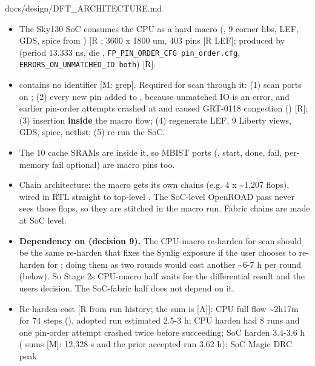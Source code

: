 \begin{relocated}{docs/design/DFT_ARCHITECTURE.md}
\begin{itemize}
\tightlist
\item
  The Sky130 SoC consumes the CPU as a hard macro
  (, 9 corner libs, LEF, GDS, spice from
  ) {[}R \code{soc/config.json}{]}; 3600 x 1800 um,
  403 pins {[}R LEF{]}; produced by 
  (period 13.333 ns, die \code{[0,0,3600,1800]},
  \texttt{FP\_\allowbreak{}PIN\_\allowbreak{}ORDER\_\allowbreak{}CFG\ pin\_\allowbreak{}order.\allowbreak{}cfg},
  \texttt{ERRORS\_\allowbreak{}ON\_\allowbreak{}UNMATCHED\_\allowbreak{}IO\ both})
  {[}R{]}.
\item
   contains no  identifier {[}M:
  grep{]}. Required for scan through it: (1) scan ports on
  ; (2) every new pin added to ,
  because unmatched IO is an error, and earlier pin-order attempts
  crashed at  and caused GRT-0118 congestion
  () {[}R{]}; (3) insertion \textbf{inside}
  the macro flow; (4) regenerate LEF, 9 Liberty views, GDS, spice,
  netlist; (5) re-run the SoC.
\item
  The 10 cache SRAMs are inside it, so MBIST ports (,
  start, done, fail, per-memory fail optional) are macro pins too.
\item
  Chain architecture: the macro gets its own chains (e.g. 4 x
  \textasciitilde1,207 flops), wired in  RTL straight to
  top-level . The SoC-level OpenROAD pass never
  sees those flops, so they are stitched in the macro run. Fabric chains
  are made at SoC level.
\item
  \textbf{Dependency on  (decision 9).} The CPU-macro
  re-harden for scan should be the same re-harden that fixes the Synlig
  exposure if the user chooses to re-harden for ; doing them
  as two rounds would cost another \textasciitilde6-7 h per round
  (below). So Stage 2\textquotesingle s CPU-macro half waits for the
   differential result and the user\textquotesingle s
  decision. The SoC-fabric half does not depend on it.
\item
  Re-harden cost {[}R from run history; the sum is {[}A{]}{]}: CPU full
  flow \textasciitilde2h17m for 74 steps
  (), adopted run estimated 2.5-3 h; CPU
  harden had 8 runs and one pin-order attempt crashed twice before
  succeeding; SoC harden 3.4-3.6 h ( sums {[}M{]}:
  12,328 s and the prior accepted run 3.62 h); SoC Magic DRC peak

\end{itemize}
\end{relocated}
